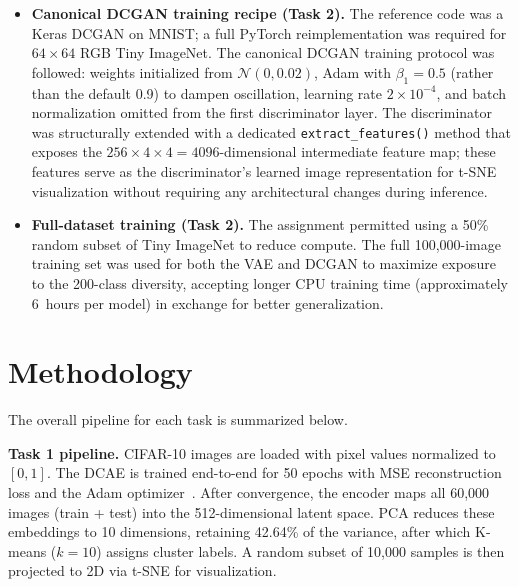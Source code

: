 \documentclass[12pt]{article}
\begin{document}
\begin{itemize}
    \item \textbf{Canonical DCGAN training recipe (Task 2).}
    The reference code was a Keras DCGAN on MNIST; a full PyTorch reimplementation was required for $64\times64$ RGB Tiny ImageNet.
    The canonical DCGAN training protocol was followed: weights initialized from $\mathcal{N}(0, 0.02)$, Adam with $\beta_1=0.5$ (rather than the default 0.9) to dampen oscillation, learning rate $2\times10^{-4}$, and batch normalization omitted from the first discriminator layer.
    The discriminator was structurally extended with a dedicated \texttt{extract\_features()} method that exposes the $256\times4\times4 = 4096$-dimensional intermediate feature map; these features serve as the discriminator's learned image representation for t-SNE visualization without requiring any architectural changes during inference.

    \item \textbf{Full-dataset training (Task 2).}
    The assignment permitted using a 50\% random subset of Tiny ImageNet to reduce compute.
    The full 100,000-image training set was used for both the VAE and DCGAN to maximize exposure to the 200-class diversity, accepting longer CPU training time (approximately 6~hours per model) in exchange for better generalization.
\end{itemize}

\section{Methodology}

The overall pipeline for each task is summarized below.

\textbf{Task 1 pipeline.} CIFAR-10 images are loaded with pixel values normalized to $[0, 1]$. The DCAE is trained end-to-end for 50 epochs with MSE reconstruction loss and the Adam optimizer~\cite{adam2014}. After convergence, the encoder maps all 60,000 images (train + test) into the 512-dimensional latent space. PCA reduces these embeddings to 10 dimensions, retaining 42.64\% of the variance, after which K-means ($k=10$) assigns cluster labels. A random subset of 10,000 samples is then projected to 2D via t-SNE for visualization.
\end{document}
